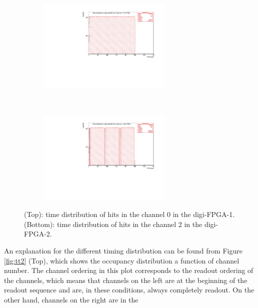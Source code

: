 \begin{figure}[!h]
  \begin{subfigure}[b]{\textwidth}
      \centering
      \includegraphics[width=0.7\textwidth]{figures/pdf/figure_00007_timedistr_roc_simulation_ch0_281.pdf}
      \label{fig:t1}
  \end{subfigure}
\\
  \begin{subfigure}[b]{\textwidth}
      \centering
      \includegraphics[width=0.7\textwidth]{figures/pdf/figure_00003_timedistr_roc_simulation_ch2_281.pdf}
      \label{fig:t2}
  \end{subfigure}
     \caption{(Top): time distribution of hits in the channel 0 in the digi-FPGA-1.
     (Bottom): time distribution of hits in the channel 2 in the digi-FPGA-2.}
     \label{fig:1}
\end{figure}
An explanation for the different timing distribution 
can be found from Figure \ref{fig:tt2} (Top), 
which shows the occupancy distribution a function of channel number.
The channel ordering in this plot corresponds to the readout 
ordering of the channels, which means that channels on the 
left are at the beginning of the readout sequence and are, in these conditions, always 
completely readout. On the other hand, channels on the right are in the 
